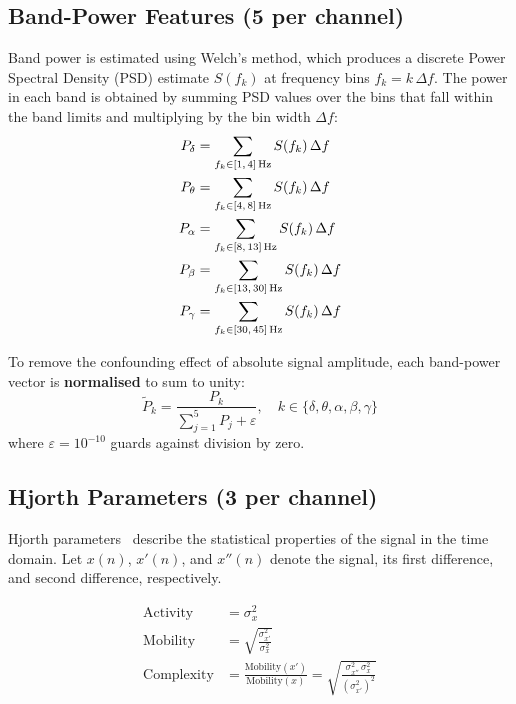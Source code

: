 \documentclass[12pt, a4paper]{report}
\begin{document}
\subsection{Band-Power Features (5 per channel)}

Band power is estimated using Welch's method, which produces a discrete
Power Spectral Density (PSD) estimate $S(f_k)$ at frequency bins
$f_k = k\,\Delta f$.  The power in each band is obtained by summing PSD
values over the bins that fall within the band limits and multiplying by
the bin width $\Delta f$:
\begin{align}
  P_\delta &= \sum_{f_k \in [1,\,4]\,\text{Hz}}   S(f_k)\,\Delta f \notag\\
  P_\theta &= \sum_{f_k \in [4,\,8]\,\text{Hz}}   S(f_k)\,\Delta f \notag\\
  P_\alpha &= \sum_{f_k \in [8,\,13]\,\text{Hz}}  S(f_k)\,\Delta f \notag\\
  P_\beta  &= \sum_{f_k \in [13,\,30]\,\text{Hz}} S(f_k)\,\Delta f \notag\\
  P_\gamma &= \sum_{f_k \in [30,\,45]\,\text{Hz}} S(f_k)\,\Delta f \notag
\end{align}

To remove the confounding effect of absolute signal amplitude, each
band-power vector is \textbf{normalised} to sum to unity:
\begin{equation}
  \tilde{P}_k = \frac{P_k}{\displaystyle\sum_{j=1}^{5} P_j + \varepsilon},
  \quad k \in \{\delta, \theta, \alpha, \beta, \gamma\}
  \label{eq:bpnorm}
\end{equation}
where $\varepsilon = 10^{-10}$ guards against division by zero.

\subsection{Hjorth Parameters (3 per channel)}

Hjorth parameters~\cite{hjorth1970eeg} describe the statistical properties
of the signal in the time domain. Let $x(n)$, $x'(n)$, and $x''(n)$
denote the signal, its first difference, and second difference,
respectively.

\begin{align}
  \text{Activity}   &= \sigma^2_x \label{eq:hjorth_act} \\[4pt]
  \text{Mobility}   &= \sqrt{\frac{\sigma^2_{x'}}{\sigma^2_x}}
                      \label{eq:hjorth_mob} \\[4pt]
  \text{Complexity} &= \frac{\text{Mobility}(x')}{\text{Mobility}(x)}
                      = \sqrt{\frac{\sigma^2_{x''}\,\sigma^2_x}{\left(\sigma^2_{x'}\right)^2}}
                      \label{eq:hjorth_comp}
\end{align}
\end{document}
